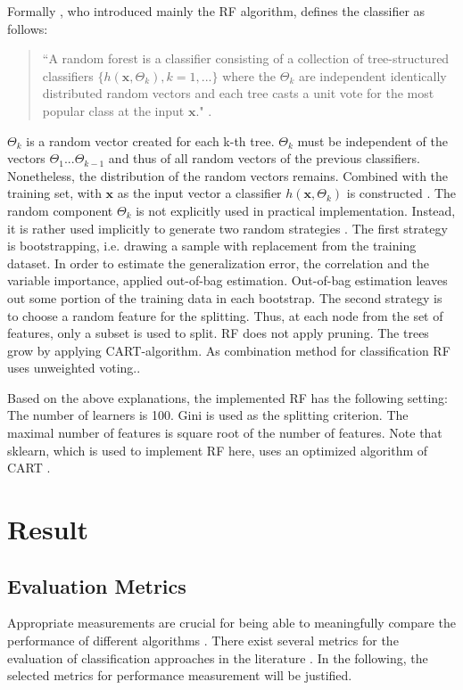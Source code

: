 \documentclass[12pt, a4paper, titlepage]{article}
\begin{document}
Formally \citet{breiman2001}, who introduced mainly the \ac{RF} algorithm, defines the classifier as follows:

\begin{quote}
``A random forest is a classifier consisting of a collection of tree-structured classifiers $\{h(\textbf{x}, \Theta_k), k = 1, ...\}$ where the ${\Theta_k}$ are independent identically distributed random vectors and each tree casts a unit vote for the most popular class at the input $\textbf{x}$." \citep[6]{breiman2001}. 
\end{quote}
$\Theta_k$ is a random vector created for each k-th tree. $\Theta_k$ must be independent of the vectors $\Theta_1...\Theta_{k-1}$ and thus of all random vectors of the previous classifiers. Nonetheless, the distribution of the random vectors remains. Combined with the training set, with $\textbf{x}$ as the input vector a classifier $h(\textbf{x}, \Theta_k)$ is constructed \citep{breiman2001}. The random component $\Theta_k$ is not explicitly used in practical implementation. Instead, it is rather used implicitly to generate two random strategies \citep{cutler2012}. The first strategy is bootstrapping, i.e. drawing a sample with replacement from the training dataset. In order to estimate the generalization error, the correlation and the variable importance, \citet{breiman2001} applied out-of-bag estimation. Out-of-bag estimation leaves out some portion of the training data in each bootstrap. The second strategy is to choose a random feature for the splitting. Thus, at each node from the set of features, only a subset is used to split. \ac{RF} does not apply pruning. The trees grow by applying \ac{CART}-algorithm. As combination method for classification \ac{RF} uses unweighted voting.\citep{cutler2012}.

Based on the above explanations, the implemented \ac{RF} has the following setting: The number of learners is 100. Gini is used as the splitting criterion. The maximal number of features is square root of the number of features. Note that sklearn, which is used to implement \ac{RF} here, uses an optimized algorithm of \ac{CART} \citep{scikit-learn}.

\section{Result}
\subsection{Evaluation Metrics}
Appropriate measurements are crucial for being able to meaningfully compare the performance of different algorithms \citep{Ferri2009}. There exist several metrics for the evaluation of classification approaches in the literature \citep{Fatourechi2008}. In the following, the selected metrics for performance measurement will be justified. 
\end{document}
